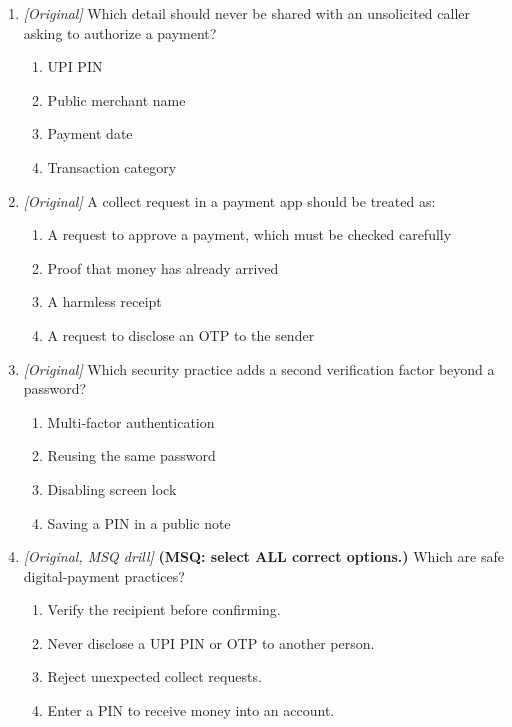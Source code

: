 \begin{enumerate}[label=\textbf{Q\arabic*.}, leftmargin=*]
\item \textit{[Original]} Which detail should never be shared with an unsolicited caller asking to authorize a payment?
  \begin{enumerate}[label=\Alph*.]
\item UPI PIN
   \item Public merchant name
   \item Payment date
   \item Transaction category
  \end{enumerate}

\item \textit{[Original]} A collect request in a payment app should be treated as:
  \begin{enumerate}[label=\Alph*.]
\item A request to approve a payment, which must be checked carefully
   \item Proof that money has already arrived
   \item A harmless receipt
   \item A request to disclose an OTP to the sender
  \end{enumerate}

\item \textit{[Original]} Which security practice adds a second verification factor beyond a password?
  \begin{enumerate}[label=\Alph*.]
\item Multi-factor authentication
   \item Reusing the same password
   \item Disabling screen lock
   \item Saving a PIN in a public note
  \end{enumerate}

\item \textit{[Original, MSQ drill]} \textbf{(MSQ: select ALL correct options.)} Which are safe digital-payment practices?
  \begin{enumerate}[label=\Alph*.]
\item Verify the recipient before confirming.
   \item Never disclose a UPI PIN or OTP to another person.
   \item Reject unexpected collect requests.
   \item Enter a PIN to receive money into an account.
  \end{enumerate}

\end{enumerate}
